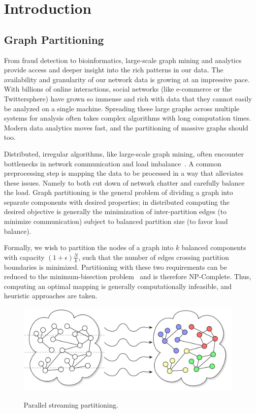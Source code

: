 \section{Introduction}
\subsection{Graph Partitioning}
From fraud detection to bioinformatics, large-scale graph mining and analytics provide access and deeper insight into the rich patterns in our data.
The availability and granularity of our network data is growing at an impressive pace.
With billions of online interactions, social networks (like e-commerce or the Twittersphere) have grown so immense and rich with data that they cannot easily be analyzed on a single machine.
Spreading these large graphs across multiple systems for analysis often takes complex algorithms with long computation times.
Modern data analytics moves fast, and the partitioning of massive graphs should too.


Distributed, irregular algorithms, like large-scale graph mining, often encounter bottlenecks in network communication and load imbalance~\cite{challenglums}. 
A common preprocessing step is mapping the data to be processed in a way that alleviates these issues.
Namely to both cut down of network chatter and carefully balance the load.
Graph partitioning is the general problem of dividing a graph into separate components with desired properties; in distributed computing the desired objective is generally the minimization of inter-partition edges (to minimize communication) subject to balanced partition size (to favor load balance).

Formally, we wish to partition the nodes of a graph into $k$ balanced components with capacity $(1+\epsilon)\frac{N}{k}$, such that the number of edges crossing partition boundaries is minimized. Partitioning with these two requirements can be reduced to the minimum-bisection problem~\cite{Garey:1979:CIG:578533} and is therefore NP-Complete. 
Thus, computing an optimal mapping is generally computationally infeasible, and heuristic approaches are taken. 

\begin{figure}[ht]
\centering
  \includegraphics[width=0.7\columnwidth]{figures/coverfig.pdf}
  \label{fig:coverfig}
  \caption{Parallel streaming partitioning.}
\end{figure}

